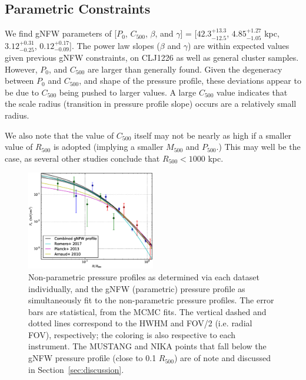 \documentclass[twocolumn,traditabstract]{aa}
\begin{document}

\subsection{Parametric Constraints}

We find gNFW parameters of [$P_0$, $C_{500}$, $\beta$, and $\gamma$] =
[$42.3_{-12.5}^{+13.3}$, $4.85_{-1.05}^{+1.27}$ kpc, $3.12_{-0.25}^{+0.31}$, $0.12_{-0.09}^{+0.17}$].
The power law slopes ($\beta$ and $\gamma$) are within expected values given previous gNFW constraints,
on CLJ1226 as well as general cluster samples. However, $P_0$, and $C_{500}$ are larger than generally
found. Given the degeneracy between $P_0$ and $C_{500}$, and shape of the pressure profile, these deviations
appear to be due to $C_{500}$ being pushed to larger values. A large $C_{500}$ value indicates that the
scale radius (transition in pressure profile slope) occurs are a relatively small radius.

We also note that the value of $C_{500}$ itself may not be nearly as high if a smaller value of $R_{500}$
is adopted (implying a smaller $M_{500}$ and $P_{500}$.) This may well be the case, as several other
studies conclude that $R_{500} < 1000$ kpc.

\begin{figure}[!h]
  \centering
  \includegraphics[width=0.5\textwidth]{NIKA_ml_deproj_figs/Real_Joint_gNFW_Real_11011111_2500S_500B_100W_gNFW_pressure_w_NP_pts_v2.eps}
  \caption{Non-parametric pressure profiles as determined via each dataset individually, and the gNFW (parametric)
    pressure profile as simultaneously fit to the non-parametric pressure profiles. The error bars are statistical,
    from the MCMC fits. The vertical dashed and dotted
    lines correspond to the HWHM and FOV/2 (i.e. radial FOV), respectively; the coloring is also respective to each
    instrument. The MUSTANG and NIKA points that fall below the gNFW pressure profile (close to 0.1 $R_{500}$) are of
    note and discussed in Section~\ref{sec:discussion}.}
  \label{fig:joint_pressure}
\end{figure}
\end{document}
